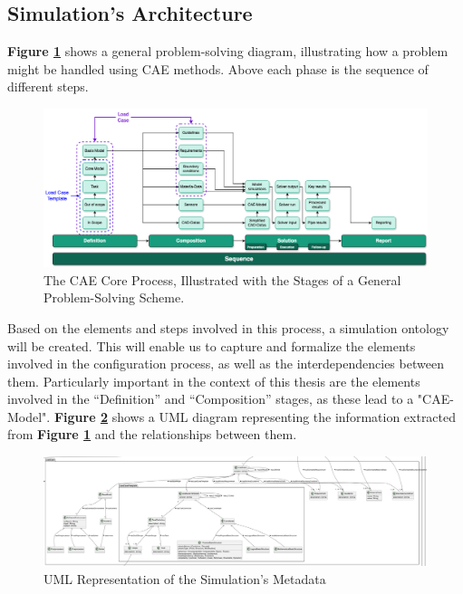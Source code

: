 \subsection{Simulation's Architecture \label{subsec:sim-archi}}
\textbf{Figure \ref{fig:cea-proc}} shows a general problem-solving diagram, illustrating how a problem might be handled using CAE methods. Above each phase is the sequence of different steps.\\

\begin{figure}[h]
    \centering
    \includegraphics[width=\textwidth]{images/Concept-cae-process.drawio.png}
    \caption[The CAE Core Process, Illustrated with the Stages of a General Problem-Solving Scheme.]{\label{fig:cea-proc}  The CAE Core Process, Illustrated with the Stages of a General Problem-Solving Scheme. \cite{assistSim}}
\end{figure}

Based on the elements and steps involved in this process, a simulation ontology will be created. This will enable us to capture and formalize the elements involved in the configuration process, as well as the interdependencies between them. Particularly important in the context of this thesis are the elements involved in the “Definition” and “Composition” stages, as these lead to a "CAE-Model". \textbf{Figure \ref{fig:uml-sim}} shows a UML diagram representing the information extracted from \textbf{Figure \ref{fig:cea-proc}} and the relationships between them.\\

\begin{figure}[h]
    \centering
    \includegraphics[width=\textwidth]{images/UML-Sim.png}
    \caption{\label{fig:uml-sim}  UML Representation of the Simulation’s Metadata}
\end{figure}


